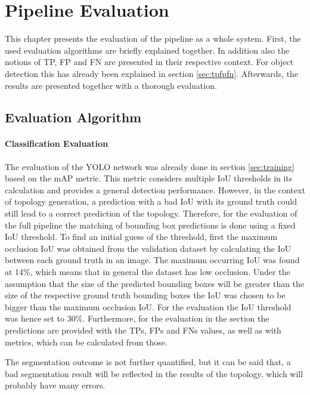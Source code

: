 \chapter{Pipeline Evaluation}

This chapter presents the evaluation of the pipeline as a whole system.
First, the used evaluation algorithms are briefly explained together.
In addition also the notions of \ac{TP}, \ac{FP} and \ac{FN} are presented in their respective context.
For object detection this has already been explained in section \ref{sec:tpfpfn}.
Afterwards, the results are presented together with a thorough evaluation.

\section{Evaluation Algorithm}
\label{sec:eval_algo}

\subsubsection{Classification Evaluation}

The evaluation of the \ac{YOLO} network was already done in section \ref{sec:training}  based on the \ac{mAP} metric.
This metric considers multiple \ac{IoU} thresholds in its calculation and provides a general detection performance.
However, in the context of topology generation, a prediction with a bad \ac{IoU} with its ground truth could still lead to a correct prediction of the topology.
Therefore, for the evaluation of the full pipeline the matching of bounding box predictions is done using a fixed \ac{IoU} threshold.
To find an initial guess of the threshold, first the maximum occlusion \ac{IoU} was obtained from the validation dataset by calculating the \ac{IoU} between each ground truth in an image.
The maximum occurring \ac{IoU} was found at 14\%, which means that in general the dataset has low occlusion.
Under the assumption that the size of the predicted bounding boxes will be greater than the size of the respective ground truth bounding boxes the \ac{IoU} was chosen to be bigger than the maximum occlusion \ac{IoU}.
For the evaluation the \ac{IoU} threshold was hence set to 30\%.
Furthermore, for the evaluation in the section the predictions are provided with the \acp{TP}, \acp{FP} and \acp{FN} values, as well as with metrics, which can be calculated from those.

The segmentation outcome is not further quantified, but it can be said that, a bad segmentation result will be reflected in the results of the topology, which will probably have many errors.

